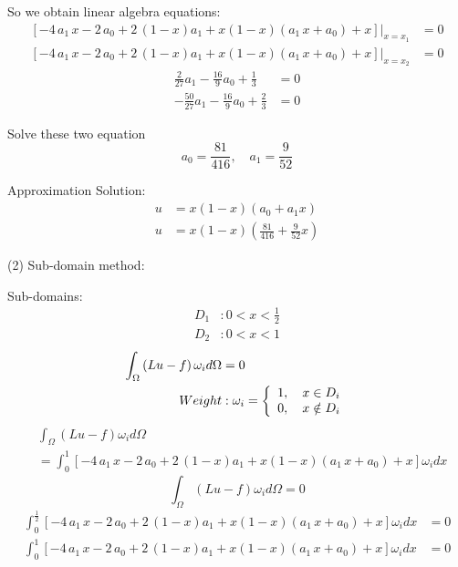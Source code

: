 \documentclass{article}%
\begin{document}
So we obtain linear algebra equations:%
\begin{align*}
\left.  \left[  -4\,a_{1}\,x-2\,a_{0}+2\,\left(  1-x\right)  a_{1}+x\left(
1-x\right)  \left(  a_{1}\,x+a_{0}\right)  +x\right]  \right\vert _{x=x_{1}}
&  =0\\
\left.  \left[  -4\,a_{1}\,x-2\,a_{0}+2\,\left(  1-x\right)  a_{1}+x\left(
1-x\right)  \left(  a_{1}\,x+a_{0}\right)  +x\right]  \right\vert _{x=x_{2}}
&  =0
\end{align*}%
\begin{align*}
\frac{2}{27}a_{1}-\frac{16}{9}a_{0}+\frac{1}{3}  &  =0\\
-\frac{50}{27}a_{1}-\frac{16}{9}a_{0}+\frac{2}{3}  &  =0
\end{align*}


Solve these two equation%
\[
a_{0}=\frac{81}{416},\quad a_{1}=\frac{9}{52}%
\]


Approximation Solution:%
\begin{align*}
u  &  =x\left(  1-x\right)  \left(  a_{0}+a_{1}x\right) \\
u  &  =x\left(  1-x\right)  \left(  \frac{81}{416}+\frac{9}{52}x\right)
\end{align*}


(2) Sub-domain method:

Sub-domains:%
\begin{align*}
D_{1}  &  :0<x<\frac{1}{2}\\
D_{2}  &  :0<x<1
\end{align*}%
\begin{align*}
\int_{\Omega}\left(  Lu-f\right)  \omega_{i}d\Omega &  =0\\
Weight  &  :\omega_{i}=\left\{
\begin{array}
[c]{c}%
1,\quad x\in D_{i}\\
0,\quad x\notin D_{i}%
\end{array}
\right.
\end{align*}%
\begin{align*}
&  \int_{\Omega}\left(  Lu-f\right)  \omega_{i}d\Omega\\
&  =\int_{0}^{1}\left[  -4\,a_{1}\,x-2\,a_{0}+2\,\left(  1-x\right)
a_{1}+x\left(  1-x\right)  \left(  a_{1}\,x+a_{0}\right)  +x\right]
\omega_{i}dx
\end{align*}%
\[
\int_{\Omega}\left(  Lu-f\right)  \omega_{i}d\Omega=0
\]%
\begin{align*}
\int_{0}^{\frac{1}{2}}\left[  -4\,a_{1}\,x-2\,a_{0}+2\,\left(  1-x\right)
a_{1}+x\left(  1-x\right)  \left(  a_{1}\,x+a_{0}\right)  +x\right]
\omega_{i}dx  &  =0\\
\int_{0}^{1}\left[  -4\,a_{1}\,x-2\,a_{0}+2\,\left(  1-x\right)
a_{1}+x\left(  1-x\right)  \left(  a_{1}\,x+a_{0}\right)  +x\right]
\omega_{i}dx  &  =0
\end{align*}
\end{document}
